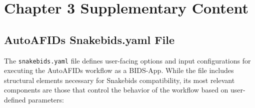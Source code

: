 \chapter{Chapter 3 Supplementary Content}\label{app:ch3suppcontent}
\newpage

\section{AutoAFIDs Snakebids.yaml File}
\label{app:yaml}
The \texttt{snakebids.yaml} file defines user-facing options and input configurations for executing the AutoAFIDs workflow as a BIDS-App. While the file includes structural elements necessary for Snakebids compatibility, its most relevant components are those that control the behavior of the workflow based on user-defined parameters:
